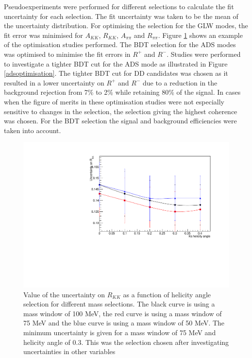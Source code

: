 Pseudoexperiments were performed for different selections to calculate the fit uncertainty for each selection. The fit uncertainty was taken to be the mean of the uncertainty distribution. For optimising the selection for the GLW modes, the fit error was minimised for $A_{KK}$, $R_{KK}$, $A_{\pi\pi}$ and $R_{\pi\pi}$. Figure \ref{optimisation} shows an example of the optimisation studies performed. The BDT selection for the ADS modes was optimised to minimise the fit errors in $R^+$ and $R^-$. Studies were performed to investigate a tighter BDT cut for the ADS mode as illustrated in Figure \ref{adsoptimisation}. The tighter BDT cut for DD candidates was chosen as it resulted in a lower uncertainty on $R^+$ and $R^-$ due to a reduction in the background rejection from 7\% to 2\% while retaining 80\% of the signal. In cases when the figure of merits in these optimisation studies were not especially sensitive to changes in the selection, the selection giving the highest coherence was chosen. For the BDT selection the signal and background efficiencies were taken into account.

\begin{figure}
\centering
\includegraphics[width=0.8\linewidth]{figures/selection/optimisation.pdf}
\caption{Value of the uncertainty on $R_{KK}$ as a function of \KS helicity angle selection for different \Kstar mass selections. The black curve is using a \Kstar mass window of 100 MeV, the red curve is using a \Kstar mass window of 75 MeV and the blue curve is using a \Kstar mass window of 50 MeV. The minimum uncertainty is given for a \Kstar mass window of 75 MeV and \KS helicity angle of 0.3. This was the \Kstar selection chosen after investigating uncertainties in other variables}
\label{optimisation}
\end{figure}

